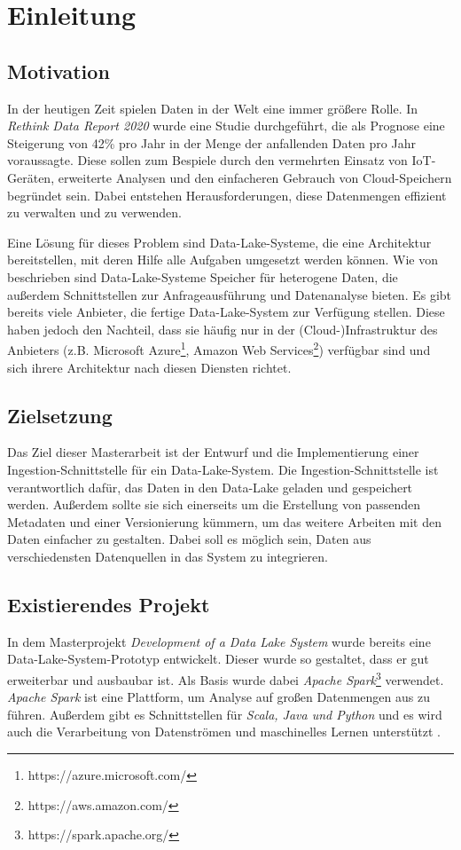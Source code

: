 \chapter{Einleitung}

\section{Motivation}
In der heutigen Zeit spielen Daten in der Welt eine immer größere Rolle.
In \textit{Rethink Data Report 2020} \citep{rethink_data_2020} wurde eine Studie durchgeführt, die als Prognose eine Steigerung von 42\% pro Jahr in der Menge der anfallenden Daten pro Jahr voraussagte.
Diese sollen zum Bespiele durch den vermehrten Einsatz von IoT-Geräten, erweiterte Analysen und den einfacheren Gebrauch von Cloud-Speichern begründet sein.
Dabei entstehen Herausforderungen, diese Datenmengen effizient zu verwalten und zu verwenden.

Eine Lösung für dieses Problem sind Data-Lake-Systeme, die eine Architektur bereitstellen, mit deren Hilfe alle Aufgaben umgesetzt werden können.
Wie von \citet{DBLP:journals/corr/abs-2106-09592} beschrieben sind Data-Lake-Systeme Speicher für heterogene Daten, die außerdem Schnittstellen zur Anfrageausführung und Datenanalyse bieten.
Es gibt bereits viele Anbieter, die fertige Data-Lake-System zur Verfügung stellen.
Diese haben jedoch den Nachteil, dass sie häufig nur in der (Cloud-)Infrastruktur des Anbieters (z.B. Microsoft Azure\footnote{https://azure.microsoft.com/}, Amazon Web Services\footnote{https://aws.amazon.com/}) verfügbar sind und sich ihrere Architektur nach diesen Diensten richtet.

\section{Zielsetzung}
Das Ziel dieser Masterarbeit ist der Entwurf und die Implementierung einer Ingestion-Schnittstelle für ein Data-Lake-System.
Die Ingestion-Schnittstelle ist verantwortlich dafür, das Daten in den Data-Lake geladen und gespeichert werden.
Außerdem sollte sie sich einerseits um die Erstellung von passenden Metadaten und einer Versionierung kümmern, um das weitere Arbeiten mit den Daten einfacher zu gestalten.
Dabei soll es möglich sein, Daten aus verschiedensten Datenquellen in das System zu integrieren.

\section{Existierendes Projekt}
In dem Masterprojekt \textit{Development of a Data Lake System} \citep{datalake_proj} wurde bereits eine Data-Lake-System-Prototyp entwickelt.
Dieser wurde so gestaltet, dass er gut erweiterbar und ausbaubar ist.
Als Basis wurde dabei \textit{Apache Spark}\footnote{https://spark.apache.org/} verwendet.
\textit{Apache Spark} ist eine Plattform, um Analyse auf großen Datenmengen aus zu führen.
Außerdem gibt es Schnittstellen für \textit{Scala, Java und Python} und es wird auch die Verarbeitung von Datenströmen und maschinelles Lernen unterstützt \citep{spark}.

